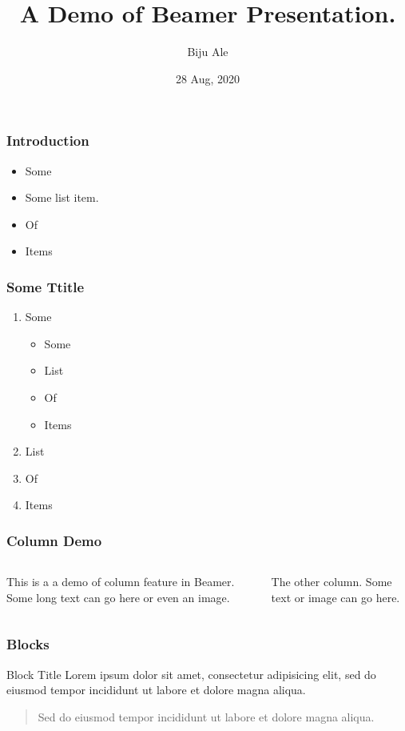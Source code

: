 \documentclass{beamer}
\title{A Demo of Beamer Presentation.}
\author{Biju Ale}
\institute{Some Institute}
\date{\scriptsize{28 Aug, 2020}}
\begin{document}
\frame{\maketitle}

\begin{frame}
	\frametitle{Introduction}
	\begin{itemize}
		\item Some\pause
		\item Some list item.\pause
		\item Of\pause
		\item Items
	\end{itemize}
\end{frame}

\begin{frame}
	\frametitle{Some Ttitle}
	\begin{enumerate}
		\item Some
			\begin{itemize}
			\item Some
			\item List
			\item Of
			\item Items
		\end{itemize}
		\item List
		\item Of
		\item Items
	\end{enumerate}
\end{frame}

\begin{frame}
	\frametitle{Column Demo}
	\begin{columns}		
		\begin{column}{.5\textwidth}
			This is a a demo of column feature in Beamer. Some long text can go here or even an image.
		\end{column}			
		\begin{column}{.5\textwidth}
			The other column. Some text or image can go here.
		\end{column}
	\end{columns}
\end{frame}

\begin{frame}
	\frametitle{Blocks}
	\begin{block}{Block Title}
		Lorem ipsum dolor sit amet, consectetur adipisicing elit, 
		sed do eiusmod tempor incididunt ut labore et 
		dolore magna aliqua.
	\end{block}

	\begin{quote}
		Sed do eiusmod tempor incididunt ut labore et dolore magna aliqua.	
	\end{quote}
\end{frame}
\end{document}
